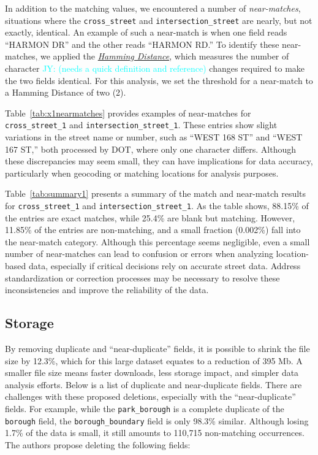 \documentclass[linenumber]{jdsart}
\newcommand{\jy}[1]{\textcolor{cyan}{JY: (#1)}}
\begin{document}
In addition to the matching values, we encountered a number of 
\textit{near-matches}, situations where the \texttt{cross\_street} 
and \texttt{intersection\_street} are nearly, but not exactly, identical. 
An example of such a near-match is when one field reads ``HARMON DR'' 
and the other reads ``HARMON RD.'' To identify these near-matches, 
we applied the \href{https://en.wikipedia.org/wiki/Hamming_distance}
{\textit{Hamming Distance}}, which measures the number of character
\jy{needs a quick definition and reference}
changes required to make the two fields identical. For this analysis, 
we set the threshold for a near-match to a Hamming Distance of two (2).


Table~\ref{tab:x1nearmatches} provides examples of near-matches for 
\texttt{cross\_street\_1} and \texttt{intersection\_street\_1}. These 
entries show slight variations in the street name or number, such as 
``WEST 168 ST'' and ``WEST 167 ST,'' both processed by DOT, where only 
one character differs. Although these discrepancies may seem small, 
they can have implications for data accuracy, particularly when 
geocoding or matching locations for analysis purposes.


Table~\ref{tab:summary1} presents a summary of the match and 
near-match results for \texttt{cross\_street\_1} and 
\texttt{intersection\_street\_1}. As the table shows, 88.15\% of the 
entries are exact matches, while 25.4\% are blank but matching. 
However, 11.85\% of the entries are non-matching, and a small fraction 
(0.002\%) fall into the near-match category. Although this percentage 
seems negligible, even a small number of near-matches can lead to 
confusion or errors when analyzing location-based data, especially 
if critical decisions rely on accurate street data. Address 
standardization or correction processes may be necessary to resolve 
these inconsistencies and improve the reliability of the data.


\subsection{Storage}
\label{sec:filesize}

By removing duplicate and ``near-duplicate'' fields, it is possible to 
shrink the file size by 12.3\%, which for this large dataset equates to 
a reduction of 395 Mb. A smaller file size means faster downloads, 
less storage impact, and simpler data analysis efforts.
Below is a list of duplicate and near-duplicate fields. There are 
challenges with these proposed deletions, especially with the 
``near-duplicate'' fields. For example, while the \texttt{park\_borough} 
is a complete duplicate of the \texttt{borough} field, the 
\texttt{borough\_boundary} field is only 98.3\% similar. Although losing 
1.7\% of the data is small, it still amounts to 110,715 non-matching 
occurrences. The authors propose deleting the following fields:
\end{document}
